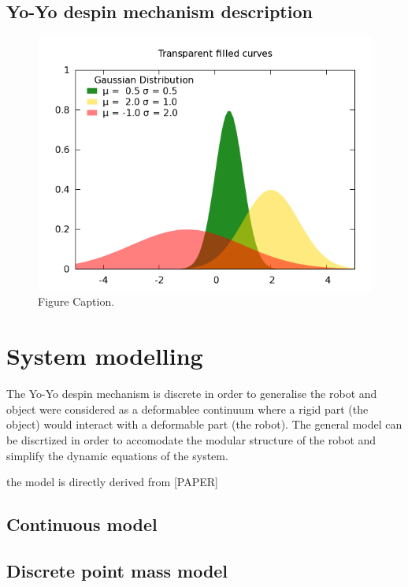 \subsection{Yo-Yo despin mechanism description}
\label{Yo-Yo despin mechanism description}
\begin{figure}[h]
	\begin{center}
		\includegraphics [width=12cm]{Figures/Background/pic.png}
		\caption{Figure Caption.}
		\label{fig:Yo-Yo despin mechanism seen in its plane of rotation}
	\end{center}
\end{figure} 



\section{System modelling}
\label{System modelling}
The Yo-Yo despin mechanism is discrete in order to generalise the robot and object were considered as a deformablee continuum where a rigid part (the object) would interact with a deformable part (the robot). The general model can be discrtized in order to accomodate the modular structure of the robot and simplify the dynamic equations of the system.

the model is directly derived from [PAPER]
\subsection{Continuous model}
\label{Continuous model}
\subsection{Discrete point mass model}
\label{Discrete point mass model}

